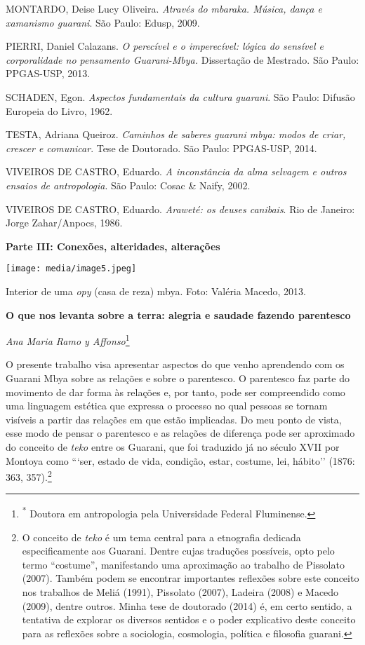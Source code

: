 MONTARDO, Deise Lucy Oliveira. \emph{Através do mbaraka. Música, dança e
xamanismo guarani}. São Paulo: Edusp, 2009.

PIERRI, Daniel Calazans. \emph{O perecível e o imperecível: lógica do
sensível e corporalidade no pensamento Guarani-Mbya.} Dissertação de
Mestrado. São Paulo: PPGAS-USP, 2013.

SCHADEN, Egon. \emph{Aspectos fundamentais da cultura guarani}. São
Paulo: Difusão Europeia do Livro, 1962.

TESTA, Adriana Queiroz. \emph{Caminhos de saberes guarani mbya: modos de
criar, crescer e comunicar}. Tese de Doutorado. São Paulo: PPGAS-USP,
2014.

VIVEIROS DE CASTRO, Eduardo. \emph{A inconstância da alma selvagem e
outros ensaios de antropologia}. São Paulo: Cosac \& Naify, 2002.

VIVEIROS DE CASTRO, Eduardo. \emph{Araweté: os deuses canibais}. Rio de
Janeiro: Jorge Zahar/Anpocs, 1986.

\textbf{Parte III: Conexões, alteridades, alterações}

\texttt{[image: media/image5.jpeg]}

Interior de uma \emph{opy} (casa de reza) mbya. Foto: Valéria Macedo,
2013.

\textbf{O que nos levanta sobre a terra: alegria e saudade fazendo
parentesco}

\emph{Ana Maria Ramo y Affonso}\footnote{\textsuperscript{*} Doutora em
  antropologia pela Universidade Federal Fluminense.}

O presente trabalho visa apresentar aspectos do que venho aprendendo com
os Guarani Mbya sobre as relações e sobre o parentesco. O parentesco faz
parte do movimento de dar forma às relações e, por tanto, pode ser
compreendido como uma linguagem estética que expressa o processo no qual
pessoas se tornam visíveis a partir das relações em que estão
implicadas. Do meu ponto de vista, esse modo de pensar o parentesco e as
relações de diferença pode ser aproximado do conceito de \emph{teko}
entre os Guarani, que foi traduzido já no século XVII por Montoya como
```ser, estado de vida, condição, estar, costume, lei, hábito'' (1876:
363, 357).\footnote{O conceito de \emph{teko} é um tema central para a
  etnografia dedicada especificamente aos Guarani. Dentre cujas
  traduções possíveis, opto pelo termo ``costume'', manifestando uma
  aproximação ao trabalho de Pissolato (2007). Também podem se encontrar
  importantes reflexões sobre este conceito nos trabalhos de Meliá
  (1991), Pissolato (2007), Ladeira (2008) e Macedo (2009), dentre
  outros. Minha tese de doutorado (2014) é, em certo sentido, a
  tentativa de explorar os diversos sentidos e o poder explicativo deste
  conceito para as reflexões sobre a sociologia, cosmologia, política e
  filosofia guarani.}

